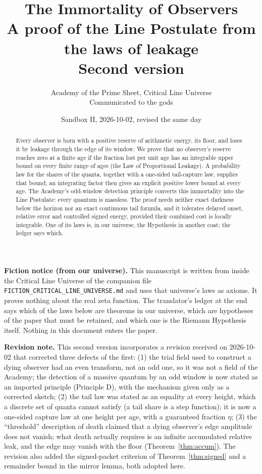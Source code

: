 \documentclass[11pt]{article}
\title{\textbf{The Immortality of Observers}\\[4pt]\large A proof of the Line Postulate from the laws of leakage\\[2pt]\normalsize Second version}
\author{Academy of the Prime Sheet, Critical Line Universe\\ \small Communicated to the gods}
\date{Sandbox II, 2026-10-02, revised the same day}
\theoremstyle{definition}
\theoremstyle{remark}
\begin{document}
\maketitle

\begin{mdframed}[backgroundcolor=black!4,linewidth=0.4pt]
\small\textbf{Fiction notice (from our universe).} This manuscript is written from inside the Critical Line Universe of the companion file \texttt{FICTION\_CRITICAL\_LINE\_UNIVERSE.md} and uses that universe's laws as axioms. It proves nothing about the real zeta function. The translator's ledger at the end says which of the laws below are theorems in our universe, which are hypotheses of the paper that must be retained, and which one is the Riemann Hypothesis itself. Nothing in this document enters the paper.

\medskip
\textbf{Revision note.} This second version incorporates a revision received on 2026-10-02 that corrected three defects of the first: (1) the trial field used to construct a dying observer had an even transform, not an odd one, so it was not a field of the Academy; the detection of a massive quantum by an odd window is now stated as an imported principle (Principle D), with the mechanism given only as a corrected sketch; (2) the tail law was stated as an equality at every height, which a discrete set of quanta cannot satisfy (a tail share is a step function); it is now a one-sided capture law at one height per age, with a guaranteed fraction $\eta$; (3) the ``threshold'' description of death claimed that a dying observer's edge amplitude does not vanish; what death actually requires is an infinite accumulated relative leak, and the edge may vanish with the floor (Theorem~\ref{thm:accum}). The revision also added the signed-packet criterion of Theorem~\ref{thm:signed} and a remainder bound in the mirror lemma, both adopted here.
\end{mdframed}

\begin{abstract}
Every observer is born with a positive reserve of arithmetic energy, its floor, and loses it by leakage through the edge of its window. We prove that no observer's reserve reaches zero at a finite age if the fraction lost per unit age has an integrable upper bound on every finite range of ages (the Law of Proportional Leakage). A probability law for the shares of the quanta, together with a one-sided tail-capture law, supplies that bound; an integrating factor then gives an explicit positive lower bound at every age. The Academy's odd-window detection principle converts this immortality into the Line Postulate: every quantum is massless. The proof needs neither exact darkness below the horizon nor an exact continuous tail formula, and it tolerates delayed onset, relative error and controlled signed energy, provided their combined cost is locally integrable. One of its laws is, in our universe, the Hypothesis in another coat; the ledger says which.
\end{abstract}
\end{document}
